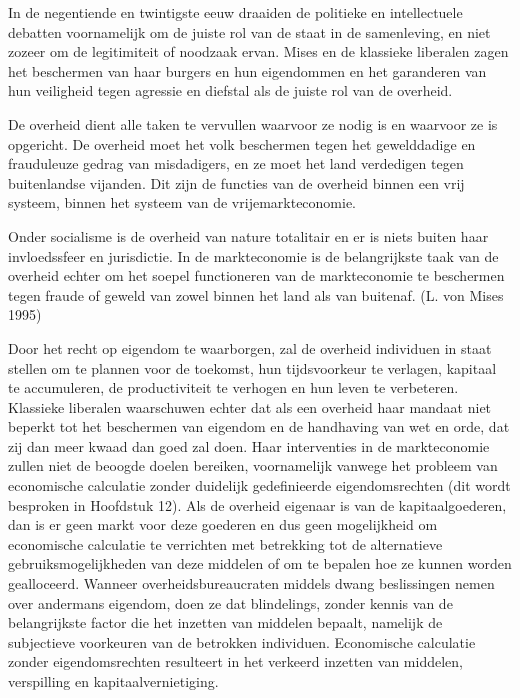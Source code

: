 \documentclass[
  a5paper,
  smalldemyvopaper,11pt,twoside,onecolumn,openright,extrafontsizes,
hidelinks]{memoir}
\begin{document}
In de negentiende en twintigste eeuw draaiden de politieke en
intellectuele debatten voornamelijk om de juiste rol van de staat in de
samenleving, en niet zozeer om de legitimiteit of noodzaak ervan. Mises
en de klassieke liberalen zagen het beschermen van haar burgers en hun
eigendommen en het garanderen van hun veiligheid tegen agressie en
diefstal als de juiste rol van de overheid.

De overheid dient alle taken te vervullen waarvoor ze nodig is en
waarvoor ze is opgericht. De overheid moet het volk beschermen tegen het
gewelddadige en frauduleuze gedrag van misdadigers, en ze moet het land
verdedigen tegen buitenlandse vijanden. Dit zijn de functies van de
overheid binnen een vrij systeem, binnen het systeem van de
vrijemarkteconomie.

Onder socialisme is de overheid van nature totalitair en er is niets
buiten haar invloedssfeer en jurisdictie. In de markteconomie is de
belangrijkste taak van de overheid echter om het soepel functioneren van
de markteconomie te beschermen tegen fraude of geweld van zowel binnen
het land als van buitenaf. (L. von Mises 1995)

Door het recht op eigendom te waarborgen, zal de overheid individuen in
staat stellen om te plannen voor de toekomst, hun tijdsvoorkeur te
verlagen, kapitaal te accumuleren, de productiviteit te verhogen en hun
leven te verbeteren. Klassieke liberalen waarschuwen echter dat als een
overheid haar mandaat niet beperkt tot het beschermen van eigendom en de
handhaving van wet en orde, dat zij dan meer kwaad dan goed zal doen.
Haar interventies in de markteconomie zullen niet de beoogde doelen
bereiken, voornamelijk vanwege het probleem van economische calculatie
zonder duidelijk gedefinieerde eigendomsrechten (dit wordt besproken in
Hoofdstuk 12). Als de overheid eigenaar is van de kapitaalgoederen, dan
is er geen markt voor deze goederen en dus geen mogelijkheid om
economische calculatie te verrichten met betrekking tot de alternatieve
gebruiksmogelijkheden van deze middelen of om te bepalen hoe ze kunnen
worden gealloceerd. Wanneer overheidsbureaucraten middels dwang
beslissingen nemen over andermans eigendom, doen ze dat blindelings,
zonder kennis van de belangrijkste factor die het inzetten van middelen
bepaalt, namelijk de subjectieve voorkeuren van de betrokken individuen.
Economische calculatie zonder eigendomsrechten resulteert in het
verkeerd inzetten van middelen, verspilling en kapitaalvernietiging.
\end{document}
